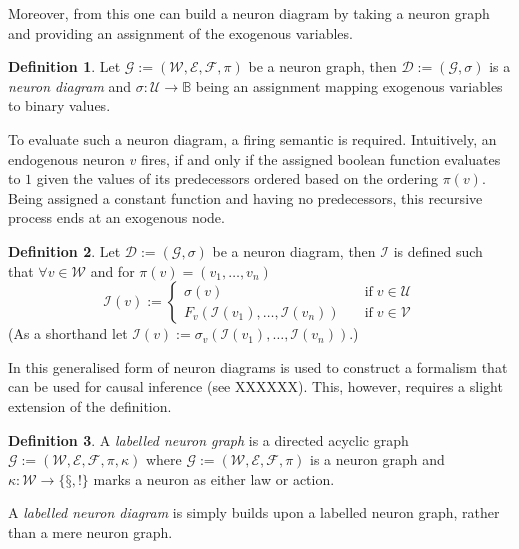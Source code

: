 \documentclass[11pt,a4paper]{book}
\theoremstyle{definition}
\newtheorem{definition}{Definition}[section]
\theoremstyle{definition}
\theoremstyle{definition}
\theoremstyle{remark}
\newcommand{\interi}{\mathcal{I}}
\newcommand{\ngraph}{\mathcal{G}}
\newcommand{\ndiagram}{\mathcal{D}}
\newcommand{\cfoos}{\mathcal{F}}
\newcommand{\cvars}{\mathcal{W}}
\newcommand{\cenvars}{\mathcal{V}}
\newcommand{\cexvars}{\mathcal{U}}
\newcommand{\crel}{\mathcal{E}}
\newcommand{\cbinfoos}{\mathbb{F}_{\mathbb{B}}}
\begin{document}
Moreover, from this one can build a neuron diagram by taking a neuron graph and providing an assignment of the exogenous variables.

\begin{definition}
Let $\ngraph:=(\cvars, \crel, \cfoos, \pi)$ be a neuron graph, then $\ndiagram:= (\ngraph,\sigma)$ is a \emph{neuron diagram} and 
$\sigma : \cexvars \to \mathbb{B}$ being an assignment mapping exogenous variables to binary values.
\end{definition}

To evaluate such a neuron diagram, a firing semantic is required. Intuitively, an endogenous neuron $v$ fires, if and only if the assigned boolean function evaluates to $1$ given the values of its predecessors ordered based on the ordering $\pi(v)$. Being assigned a constant function and having no predecessors, this recursive process ends at an exogenous node.

\begin{definition}
Let $\ndiagram:=(\ngraph,\sigma) $ be a neuron diagram, then $\interi$ is defined such that $\forall v \in \cvars$ and for $\pi(v)=(v_1, \dots, v_n)$
\begin{equation*}
\interi(v):= 
\begin{cases}
\sigma(v) & \quad \text{if} \; v \in \cexvars \\
F_v(\mathcal{I}(v_1), \dots , \mathcal{I}(v_n)) & \quad \text{if} \; v \in \cenvars
\end{cases}
\end{equation*}
(As a shorthand let $\interi(v):= \sigma_v(\mathcal{I}(v_1), \dots , \mathcal{I}(v_n))$.)
\end{definition}


In \cite{erwig2010causal} this generalised form of neuron diagrams is used to construct a formalism that can be used for causal inference (see XXXXXX). This, however, requires a slight extension of the definition.

\begin{definition}
A \emph{labelled neuron graph} is a directed acyclic graph $\ngraph:=(\cvars, \crel, \cfoos, \pi, \kappa)$ where  $\ngraph:=(\cvars, \crel, \cfoos, \pi)$  is a neuron graph and $\kappa:\cvars \to \{\text{§},!\}$ marks a neuron as either law or action. 
\end{definition}

A \emph{labelled neuron diagram} is simply builds upon a labelled neuron graph, rather than a mere neuron graph.
\end{document}
